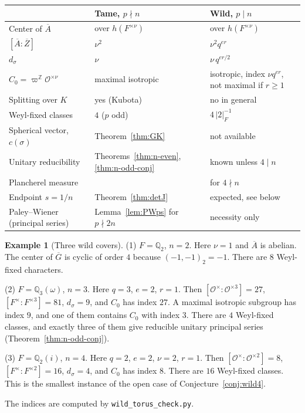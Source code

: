 \documentclass[12pt,letterpaper]{article}
\numberwithin{equation}{section}
\theoremstyle{definition}
\newtheorem{example}[theorem]{Example}
\newcommand{\Z}{\mathbb Z}
\newcommand{\Q}{\mathbb Q}
\newcommand{\OF}{\mathcal O}
\newcommand{\vp}{\varpi}
\newcommand{\bG}{\overline{G}}
\newcommand{\bA}{\overline{A}}
\newcommand{\bZ}{\overline{Z}}
\begin{document}
\begin{center}\small
\begin{tabular}{@{}>{\raggedright}p{4.2cm}>{\raggedright}p{5.2cm}>{\raggedright\arraybackslash}p{5.6cm}@{}}
\toprule
 & \textbf{Tame, $p\nmid n$} & \textbf{Wild, $p\mid n$}\\
\midrule
Center of $\bA$ & over $h(F^{\times\nu})$ & over $h(F^{\times\nu})$\\
$[\bA:\bZ]$ & $\nu^2$ & $\nu^2q^{er}$\\
$d_\sigma$ & $\nu$ & $\nu\,q^{er/2}$\\
$C_0=\vp^{\Z}\OF^{\times\nu}$ & maximal isotropic & isotropic, index $\nu q^{er}$, not maximal if $r\ge1$\\
Splitting over $K$ & yes (Kubota) & no in general\\
Weyl-fixed classes & $4$ ($p$ odd) & $4\,|2|_F^{-1}$\\
Spherical vector, $c(\sigma)$ & Theorem~\ref{thm:GK} & not available\\
Unitary reducibility & Theorems~\ref{thm:n-even}, \ref{thm:n-odd-conj} & known unless $4\mid n$\\
Plancherel measure & \cite{GS16} & \cite{Sz19} for $4\nmid n$\\
Endpoint $s=1/n$ & Theorem~\ref{thm:detJ} & expected, see below\\
Paley--Wiener (principal series) & Lemma~\ref{lem:PWps} for $p\nmid2n$ & necessity only\\
\bottomrule
\end{tabular}
\end{center}

\begin{example}[Three wild covers]\label{ex:wild}
(1) $F=\Q_2$, $n=2$.  Here $\nu=1$ and $\bA$ is abelian.  The center of $\bG$ is cyclic of
order $4$ because $(-1,-1)_2=-1$.  There are $8$ Weyl-fixed characters.

(2) $F=\Q_3(\omega)$, $n=3$.  Here $q=3$, $e=2$, $r=1$.  Then $[\OF^\times:\OF^{\times3}]=27$,
$[F^\times:F^{\times3}]=81$, $d_\sigma=9$, and $C_0$ has index $27$.  A maximal isotropic
subgroup has index $9$, and one of them contains $C_0$ with index $3$.  There are $4$ Weyl-fixed
classes, and exactly three of them give reducible unitary principal series
(Theorem~\ref{thm:n-odd-conj}).

(3) $F=\Q_2(i)$, $n=4$.  Here $q=2$, $e=2$, $\nu=2$, $r=1$.  Then
$[\OF^\times:\OF^{\times2}]=8$, $[F^\times:F^{\times2}]=16$, $d_\sigma=4$, and $C_0$ has index
$8$.  There are $16$ Weyl-fixed classes.  This is the smallest instance of the open case
of Conjecture~\ref{conj:wild4}.

The indices are computed by \texttt{wild\_torus\_check.py}.
\end{example}
\end{document}
